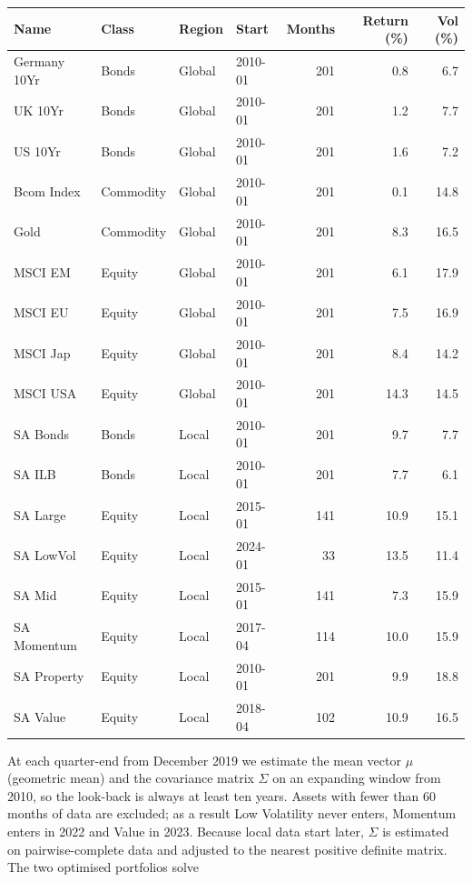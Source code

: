 \documentclass[11pt,preprint]{elsarticle}
\let\origtable\table
\let\endorigtable\endtable
\renewenvironment{table}[1][2] {
    \expandafter\origtable\expandafter[H]
} {
    \endorigtable
}
\numberwithin{equation}{section}
\numberwithin{figure}{section}
\numberwithin{table}{section}
\begin{document}
\begin{table}[H]
\centering
\caption{Asset universe: annualised return and volatility over each asset's full sample \label{tab:assets}} 
\begingroup\footnotesize
\begin{tabular}{llllrrr}
  \hline
Name & Class & Region & Start & Months & Return (\%) & Vol (\%) \\ 
  \hline
Germany 10Yr & Bonds & Global & 2010-01 & 201 & 0.8 & 6.7 \\ 
  UK 10Yr & Bonds & Global & 2010-01 & 201 & 1.2 & 7.7 \\ 
  US 10Yr & Bonds & Global & 2010-01 & 201 & 1.6 & 7.2 \\ 
  Bcom Index & Commodity & Global & 2010-01 & 201 & 0.1 & 14.8 \\ 
  Gold & Commodity & Global & 2010-01 & 201 & 8.3 & 16.5 \\ 
  MSCI EM & Equity & Global & 2010-01 & 201 & 6.1 & 17.9 \\ 
  MSCI EU & Equity & Global & 2010-01 & 201 & 7.5 & 16.9 \\ 
  MSCI Jap & Equity & Global & 2010-01 & 201 & 8.4 & 14.2 \\ 
  MSCI USA & Equity & Global & 2010-01 & 201 & 14.3 & 14.5 \\ 
  SA Bonds & Bonds & Local & 2010-01 & 201 & 9.7 & 7.7 \\ 
  SA ILB & Bonds & Local & 2010-01 & 201 & 7.7 & 6.1 \\ 
  SA Large & Equity & Local & 2015-01 & 141 & 10.9 & 15.1 \\ 
  SA LowVol & Equity & Local & 2024-01 & 33 & 13.5 & 11.4 \\ 
  SA Mid & Equity & Local & 2015-01 & 141 & 7.3 & 15.9 \\ 
  SA Momentum & Equity & Local & 2017-04 & 114 & 10.0 & 15.9 \\ 
  SA Property & Equity & Local & 2010-01 & 201 & 9.9 & 18.8 \\ 
  SA Value & Equity & Local & 2018-04 & 102 & 10.9 & 16.5 \\ 
   \hline
\end{tabular}
\endgroup
\end{table}

At each quarter-end from December 2019 we estimate the mean vector
\(\mu\) (geometric mean) and the covariance matrix \(\Sigma\) on an
expanding window from 2010, so the look-back is always at least ten
years. Assets with fewer than 60 months of data are excluded; as a
result Low Volatility never enters, Momentum enters in 2022 and Value in
2023. Because local data start later, \(\Sigma\) is estimated on
pairwise-complete data and adjusted to the nearest positive definite
matrix. The two optimised portfolios solve
\end{document}
